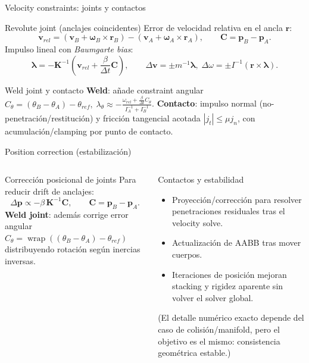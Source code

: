 \documentclass[aspectratio=169,11pt]{beamer}
\begin{document}
\begin{frame}{Velocity constraints: joints y contactos}
  \begin{block}{Revolute joint (anclajes coincidentes)}
    Error de velocidad relativa en el ancla $\mathbf{r}$:
    \[
      \mathbf{v}_{rel} = (\mathbf{v}_B + \boldsymbol{\omega}_B \times \mathbf{r}_B) -
      (\mathbf{v}_A + \boldsymbol{\omega}_A \times \mathbf{r}_A), \qquad
      \mathbf{C} = \mathbf{p}_B - \mathbf{p}_A.
    \]
    Impulso lineal con \emph{Baumgarte bias}:
    \[
      \boldsymbol{\lambda} = -\mathbf{K}^{-1}\left(\mathbf{v}_{rel} + \frac{\beta}{\Delta t}\mathbf{C}\right),
      \qquad
      \Delta\mathbf{v} = \pm m^{-1}\boldsymbol{\lambda},\;
      \Delta\omega = \pm I^{-1}(\mathbf{r}\times\boldsymbol{\lambda}).
    \]
  \end{block}

  \begin{block}{Weld joint y contacto}
    \textbf{Weld}: añade constraint angular
    \(
      C_\theta = (\theta_B-\theta_A)-\theta_{ref},\;
      \lambda_\theta \approx -\frac{\omega_{rel} + \frac{\beta}{\Delta t}C_\theta}{I_A^{-1}+I_B^{-1}}
    \).
    \textbf{Contacto}: impulso normal (no-penetración/restitución) y fricción tangencial acotada
    \( |j_t| \le \mu j_n \), con acumulación/clamping por punto de contacto.
  \end{block}
\end{frame}

\begin{frame}{Position correction (estabilización)}
  \begin{columns}[T]
    \begin{block}{Corrección posicional de joints}
      Para reducir drift de anclajes:
      \[
        \Delta \mathbf{p} \propto -\beta\,\mathbf{K}^{-1}\mathbf{C}, \qquad
        \mathbf{C}=\mathbf{p}_B-\mathbf{p}_A.
      \]
      \textbf{Weld joint}: además corrige error angular
      \(
        C_\theta = \operatorname{wrap}((\theta_B-\theta_A)-\theta_{ref})
      \)
      distribuyendo rotación según inercias inversas.
    \end{block}
    \begin{block}{Contactos y estabilidad}
      \begin{itemize}
        \item Proyección/corrección para resolver penetraciones residuales tras el velocity solve.
        \item Actualización de AABB tras mover cuerpos.
        \item Iteraciones de posición mejoran stacking y rigidez aparente sin volver el solver global.
      \end{itemize}
      \vspace{0.1cm}
      \small (El detalle numérico exacto depende del caso de colisión/manifold, pero el objetivo es el mismo: consistencia geométrica estable.)
    \end{block}
  \end{columns}
\end{frame}
\end{document}
